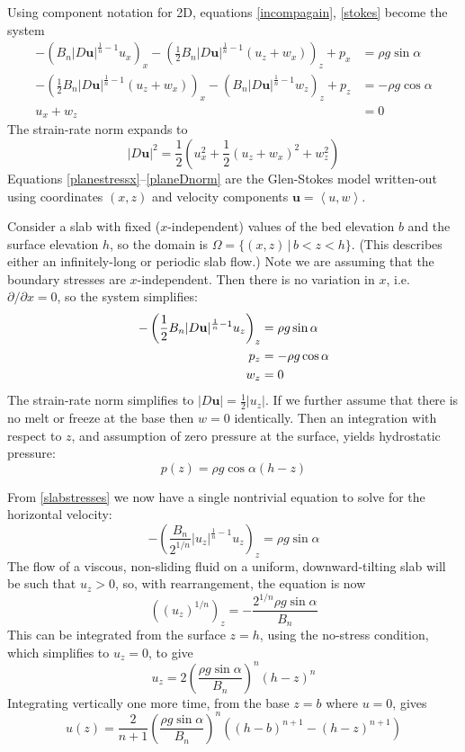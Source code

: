 \documentclass[letterpaper,final,12pt,reqno]{amsart}
\newcommand{\bu}{\mathbf{u}}
\begin{document}
Using component notation for 2D, equations \eqref{incompagain}, \eqref{stokes} become the system
\begin{align}
- \left(B_n |D\bu|^{\frac{1}{n}-1} u_x\right)_x - \left(\frac{1}{2} B_n |D\bu|^{\frac{1}{n}-1} \left(u_z+w_x\right)\right)_z + p_x &= \rho g\sin\alpha \label{planestressx} \\
- \left(\frac{1}{2} B_n |D\bu|^{\frac{1}{n}-1} \left(u_z+w_x\right)\right)_x - \left(B_n |D\bu|^{\frac{1}{n}-1} w_z\right)_z + p_z &= -\rho g\cos\alpha \label{planestressz} \\
u_x + w_z &= 0 \label{planeincomp}
\end{align}
The strain-rate norm expands to
\begin{equation}
    |D\bu|^2 = \frac{1}{2} \left(u_x^2 + \frac{1}{2}(u_z+w_x)^2 + w_z^2\right)  \label{planeDnorm}
\end{equation}
Equations \eqref{planestressx}--\eqref{planeDnorm} are the Glen-Stokes model written-out using coordinates $(x,z)$ and velocity components $\bu=\left<u,w\right>$.

Consider a slab with fixed ($x$-independent) values of the bed elevation $b$ and the surface elevation $h$, so the domain is $\Omega = \{(x,z)\,|\,b < z < h\}$.  (This describes either an infinitely-long or periodic slab flow.)  Note we are assuming that the boundary stresses are $x$-independent.  Then there is no variation in $x$, i.e.~$\partial/\partial x=0$, so the system simplifies:
\begin{align}
- \left(\frac{1}{2}B_n |D\bu|^{\frac{1}{n}-1} u_z\right)_z &= \rho g\sin\alpha \label{slabstresses} \\
p_z &= -\rho g\cos\alpha \notag \\
w_z &= 0 \notag
\end{align}
The strain-rate norm simplifies to $|D\bu| = \frac{1}{2} |u_z|$.  If we further assume that there is no melt or freeze at the base then $w=0$ identically.  Then an integration with respect to $z$, and assumption of zero pressure at the surface, yields hydrostatic pressure:
\begin{equation}
p(z) = \rho g\cos\alpha (h-z)  \label{pslab}
\end{equation}

From \eqref{slabstresses} we now have a single nontrivial equation to solve for the horizontal velocity:
    $$- \left(\frac{B_n}{2^{1/n}} |u_z|^{\frac{1}{n}-1} u_z\right)_z = \rho g\sin\alpha$$
The flow of a viscous, non-sliding fluid on a uniform, downward-tilting slab will be such that $u_z>0$, so, with rearrangement, the equation is now
    $$\left((u_z)^{1/n} \right)_z = - \frac{2^{1/n} \rho g\sin\alpha}{B_n}$$
This can be integrated from the surface $z=h$, using the no-stress condition, which simplifies to $u_z=0$, to give
\begin{equation}
u_z = 2 \left(\frac{\rho g\sin\alpha}{B_n}\right)^n (h-z)^n  \label{uzslab}
\end{equation}
Integrating vertically one more time, from the base $z=b$ where $u=0$, gives
\begin{equation}
u(z) = \frac{2}{n+1} \left(\frac{\rho g\sin\alpha}{B_n}\right)^n \left((h-b)^{n+1} - (h-z)^{n+1}\right)  \label{uslab}
\end{equation}
\end{document}
